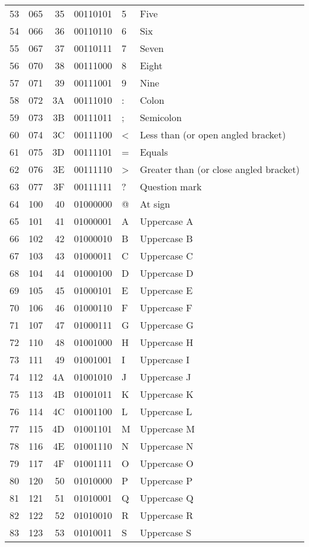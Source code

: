 \documentclass[11pt]{article}
\begin{document}
\begin{longtable}{rrrrll}
53 & 065 & 35 & 00110101 & 5 & Five\\
54 & 066 & 36 & 00110110 & 6 & Six\\
55 & 067 & 37 & 00110111 & 7 & Seven\\
56 & 070 & 38 & 00111000 & 8 & Eight\\
57 & 071 & 39 & 00111001 & 9 & Nine\\
58 & 072 & 3A & 00111010 & : & Colon\\
59 & 073 & 3B & 00111011 & ; & Semicolon\\
60 & 074 & 3C & 00111100 & < & Less than (or open angled bracket)\\
61 & 075 & 3D & 00111101 & = & Equals\\
62 & 076 & 3E & 00111110 & > & Greater than (or close angled bracket)\\
63 & 077 & 3F & 00111111 & ? & Question mark\\
64 & 100 & 40 & 01000000 & @ & At sign\\
65 & 101 & 41 & 01000001 & A & Uppercase A\\
66 & 102 & 42 & 01000010 & B & Uppercase B\\
67 & 103 & 43 & 01000011 & C & Uppercase C\\
68 & 104 & 44 & 01000100 & D & Uppercase D\\
69 & 105 & 45 & 01000101 & E & Uppercase E\\
70 & 106 & 46 & 01000110 & F & Uppercase F\\
71 & 107 & 47 & 01000111 & G & Uppercase G\\
72 & 110 & 48 & 01001000 & H & Uppercase H\\
73 & 111 & 49 & 01001001 & I & Uppercase I\\
74 & 112 & 4A & 01001010 & J & Uppercase J\\
75 & 113 & 4B & 01001011 & K & Uppercase K\\
76 & 114 & 4C & 01001100 & L & Uppercase L\\
77 & 115 & 4D & 01001101 & M & Uppercase M\\
78 & 116 & 4E & 01001110 & N & Uppercase N\\
79 & 117 & 4F & 01001111 & O & Uppercase O\\
80 & 120 & 50 & 01010000 & P & Uppercase P\\
81 & 121 & 51 & 01010001 & Q & Uppercase Q\\
82 & 122 & 52 & 01010010 & R & Uppercase R\\
83 & 123 & 53 & 01010011 & S & Uppercase S\\

\end{longtable}
\end{document}
